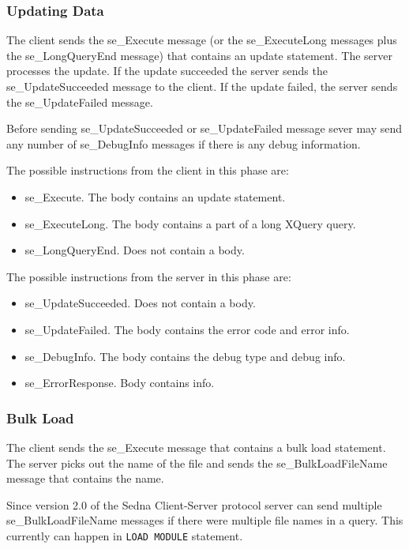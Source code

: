 \documentclass[a4paper,12pt]{article}
\begin{document}
\subsubsection{Updating Data}

The client sends the se\_Execute message (or the se\_ExecuteLong messages plus the se\_LongQueryEnd message) that contains an update statement. The server processes the update. If the update succeeded the server sends the se\_UpdateSucceeded message to the client. If the update failed, the server sends the se\_UpdateFailed message.

Before sending se\_UpdateSucceeded or se\_UpdateFailed message sever may send any number of se\_DebugInfo messages if there is any debug information.

The possible instructions from the client in this phase are:
\begin{itemize}
\item se\_Execute. The body contains an update statement.
\item se\_ExecuteLong. The body contains a part of a long XQuery query.
\item se\_LongQueryEnd. Does not contain a body.
\end{itemize}

The possible instructions from the server in this phase are:
\begin{itemize}
\item se\_UpdateSucceeded. Does not contain a body.
\item se\_UpdateFailed. The body contains the error code and error info.
\item se\_DebugInfo. The body contains the debug type and debug info.
\item se\_ErrorResponse. Body contains info.
\end{itemize}

\subsubsection{Bulk Load}

The client sends the se\_Execute message that contains a bulk load statement. The server picks out the name of the file and sends the se\_BulkLoadFileName message that contains the name.

Since version 2.0 of the Sedna Client-Server protocol server can send multiple se\_BulkLoadFileName messages if there were multiple file names in a query. This currently can happen in \verb!LOAD MODULE! statement.
\end{document}
